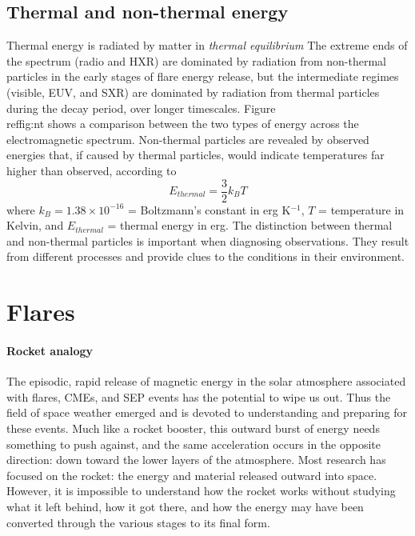 \subsection{Thermal and non-thermal energy}
Thermal energy is radiated by matter in \textit{thermal equilibrium}
The extreme ends of the spectrum (radio and HXR) are dominated by
radiation from non-thermal particles in the early stages of flare
energy release, but the intermediate regimes (visible, EUV, and SXR)
are dominated by radiation from thermal particles during the decay
period, over longer timescales.
Figure~\\ref{fig:nt} shows a comparison
between the two types of energy across the electromagnetic spectrum.
Non-thermal particles are revealed by observed energies that, if
caused by thermal particles, would indicate temperatures far higher
than observed, according to
\begin{equation}
    E_{thermal} = \frac{3}{2}k_{B}T
\end{equation}
where $k_{B} = 1.38 \times 10^{-16}$ = Boltzmann's constant in erg
K$^{-1}$, $T$ = temperature in Kelvin, and $ E_{thermal} $ = thermal
energy in erg. The distinction between thermal and non-thermal
particles is important when diagnosing observations. They result from
different processes and provide clues to the conditions in their
environment.




\newpage

\section{Flares}


\paragraph{Rocket analogy}
The episodic, rapid release of magnetic energy in the solar atmosphere
associated with flares, CMEs, and SEP events has the potential to wipe us out.
Thus the field of space weather emerged and is devoted to understanding and
preparing for these events. Much like a rocket booster, this outward burst of
energy needs something to push against, and the same acceleration occurs in the
opposite direction: down toward the lower layers of the atmosphere. Most
research has focused on the rocket: the energy and material released outward
into space. However, it is impossible to understand how the rocket works
without studying what it left behind, how it got there, and how the energy may
have been converted through the various stages to its final form.

